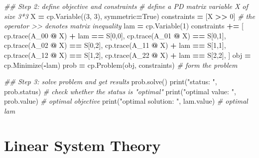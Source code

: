 \documentclass[
]{book}
\newenvironment{Shaded}{\begin{snugshade}}{\end{snugshade}}
\newcommand{\BuiltInTok}[1]{#1}
\newcommand{\CommentTok}[1]{\textcolor[rgb]{0.56,0.35,0.01}{\textit{#1}}}
\newcommand{\DecValTok}[1]{\textcolor[rgb]{0.00,0.00,0.81}{#1}}
\newcommand{\NormalTok}[1]{#1}
\newcommand{\OperatorTok}[1]{\textcolor[rgb]{0.81,0.36,0.00}{\textbf{#1}}}
\newcommand{\StringTok}[1]{\textcolor[rgb]{0.31,0.60,0.02}{#1}}
\newcommand{\VariableTok}[1]{\textcolor[rgb]{0.00,0.00,0.00}{#1}}
\theoremstyle{definition}
\theoremstyle{definition}
\theoremstyle{definition}
\theoremstyle{definition}
\theoremstyle{remark}
\begin{document}
\begin{Shaded}
\begin{Highlighting}[]
\CommentTok{\#\# Step 2: define objective and constraints}
\CommentTok{\# define a PD matrix variable X of size 3*3}
\NormalTok{X }\OperatorTok{=}\NormalTok{ cp.Variable((}\DecValTok{3}\NormalTok{, }\DecValTok{3}\NormalTok{), symmetric}\OperatorTok{=}\VariableTok{True}\NormalTok{)}
\NormalTok{constraints }\OperatorTok{=}\NormalTok{ [X }\OperatorTok{\textgreater{}\textgreater{}} \DecValTok{0}\NormalTok{] }\CommentTok{\# the operator \textgreater{}\textgreater{} denotes matrix inequality}
\NormalTok{lam }\OperatorTok{=}\NormalTok{ cp.Variable(}\DecValTok{1}\NormalTok{)}
\NormalTok{constraints }\OperatorTok{+=}\NormalTok{ [}
\NormalTok{    cp.trace(A\_00 }\OperatorTok{@}\NormalTok{ X) }\OperatorTok{+}\NormalTok{ lam }\OperatorTok{==}\NormalTok{ S[}\DecValTok{0}\NormalTok{,}\DecValTok{0}\NormalTok{],}
\NormalTok{    cp.trace(A\_01 }\OperatorTok{@}\NormalTok{ X) }\OperatorTok{==}\NormalTok{ S[}\DecValTok{0}\NormalTok{,}\DecValTok{1}\NormalTok{],}
\NormalTok{    cp.trace(A\_02 }\OperatorTok{@}\NormalTok{ X) }\OperatorTok{==}\NormalTok{ S[}\DecValTok{0}\NormalTok{,}\DecValTok{2}\NormalTok{],}
\NormalTok{    cp.trace(A\_11 }\OperatorTok{@}\NormalTok{ X) }\OperatorTok{+}\NormalTok{ lam }\OperatorTok{==}\NormalTok{ S[}\DecValTok{1}\NormalTok{,}\DecValTok{1}\NormalTok{],}
\NormalTok{    cp.trace(A\_12 }\OperatorTok{@}\NormalTok{ X) }\OperatorTok{==}\NormalTok{ S[}\DecValTok{1}\NormalTok{,}\DecValTok{2}\NormalTok{],}
\NormalTok{    cp.trace(A\_22 }\OperatorTok{@}\NormalTok{ X) }\OperatorTok{+}\NormalTok{ lam }\OperatorTok{==}\NormalTok{ S[}\DecValTok{2}\NormalTok{,}\DecValTok{2}\NormalTok{],}
\NormalTok{]}
\NormalTok{obj }\OperatorTok{=}\NormalTok{ cp.Minimize(}\OperatorTok{{-}}\NormalTok{lam)}
\NormalTok{prob }\OperatorTok{=}\NormalTok{ cp.Problem(obj, constraints) }\CommentTok{\# form the problem}

\CommentTok{\#\# Step 3: solve problem and get results}
\NormalTok{prob.solve()  }
\BuiltInTok{print}\NormalTok{(}\StringTok{"status: "}\NormalTok{, prob.status) }\CommentTok{\# check whether the status is "optimal"}
\BuiltInTok{print}\NormalTok{(}\StringTok{"optimal value: "}\NormalTok{, prob.value) }\CommentTok{\# optimal objective}
\BuiltInTok{print}\NormalTok{(}\StringTok{"optimal solution: "}\NormalTok{, lam.value) }\CommentTok{\# optimal lam}
\end{Highlighting}
\end{Shaded}

\hypertarget{app-lti-system-theory}{%
\chapter{Linear System Theory}\label{app-lti-system-theory}}
\end{document}

